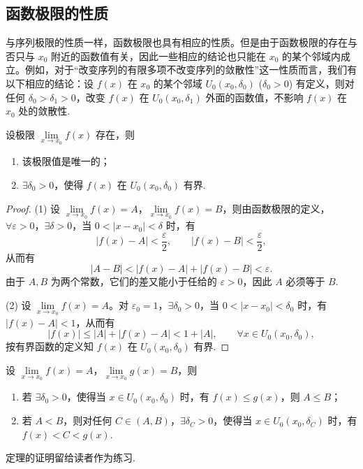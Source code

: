 \subsection{函数极限的性质}
\label{subsec:ma-3-1-2}

与序列极限的性质一样，函数极限也具有相应的性质。但是由于函数极限的存在与否只与 $x_0$ 附近的函数值有关，因此一些相应的结论也只能在 $x_0$ 的某个邻域内成立。例如，对于``改变序列的有限多项不改变序列的敛散性''这一性质而言，我们有以下相应的结论：设 $f(x)$ 在 $x_0$ 的某个邻域 $U_0(x_0,\delta_0)$ ($\delta_0>0$) 有定义，则对任何 $\delta_0>\delta_1>0$，改变 $f(x)$ 在 $U_0(x_0,\delta_1)$ 外面的函数值，不影响 $f(x)$ 在 $x_0$ 处的敛散性.

\begin{theorem}[{唯一性和有界性}]\label{theorem:ma-3-1-1}
设极限 $\lim\limits_{x\to x_0}f(x)$ 存在，则
\begin{enumerate}
  \item 该极限值是唯一的；
  \item $\exists\delta_0>0$，使得 $f(x)$ 在 $U_0(x_0,\delta_0)$ 有界.
\end{enumerate}
\end{theorem}


\begin{proof}
(1) 设 $\lim\limits_{x\to x_0}f(x)=A$，$\lim\limits_{x\to x_0}f(x)=B$，则由函数极限的定义，$\forall\varepsilon>0$，$\exists\delta>0$，当 $0<|x-x_0|<\delta$ 时，有
\[
  |f(x)-A|<\frac{\varepsilon}{2},\qquad |f(x)-B|<\frac{\varepsilon}{2},
\]
从而有
\[
  |A-B|<|f(x)-A|+|f(x)-B|<\varepsilon.
\]
由于 $A,B$ 为两个常数，它们的差又能小于任给的 $\varepsilon>0$，因此 $A$ 必须等于 $B$.

(2) 设 $\lim\limits_{x\to x_0}f(x)=A$。对 $\varepsilon_0=1$，$\exists\delta_0>0$，当 $0<|x-x_0|<\delta_0$ 时，有 $|f(x)-A|<1$，从而有
\[
  |f(x)|\leqslant |A|+|f(x)-A|<1+|A|,\qquad \forall x\in U_0(x_0,\delta_0),
\]
按有界函数的定义知 $f(x)$ 在 $U_0(x_0,\delta_0)$ 有界.
\end{proof}


\begin{theorem}[{保序性}]\label{theorem:ma-3-1-2}
设 $\lim\limits_{x\to x_0}f(x)=A$，$\lim\limits_{x\to x_0}g(x)=B$，则
\begin{enumerate}
  \item 若 $\exists\delta_0>0$，使得当 $x\in U_0(x_0,\delta_0)$ 时，有 $f(x)\leqslant g(x)$，则 $A\leqslant B$；
  \item 若 $A<B$，则对任何 $C\in(A,B)$，$\exists\delta_C>0$，使得当 $x\in U_0(x_0,\delta_C)$ 时，有 $f(x)<C<g(x)$.
\end{enumerate}
定理的证明留给读者作为练习.
\end{theorem}


